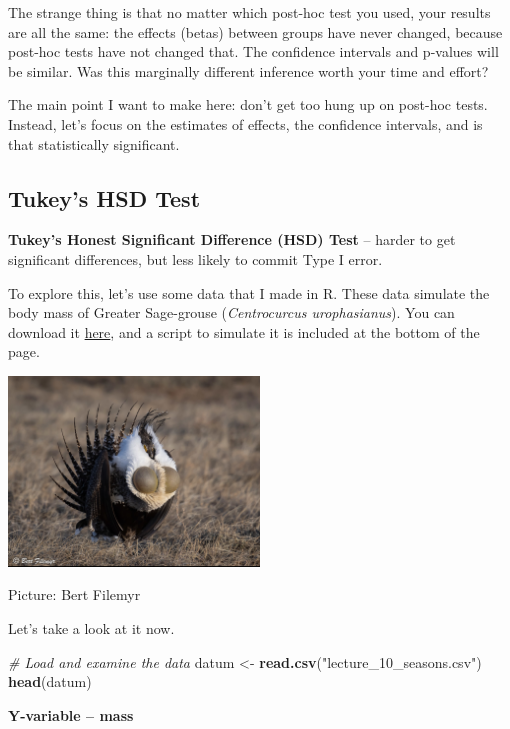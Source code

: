 \documentclass[
]{article}
\newenvironment{Shaded}{\begin{snugshade}}{\end{snugshade}}
\newcommand{\CommentTok}[1]{\textcolor[rgb]{0.56,0.35,0.01}{\textit{#1}}}
\newcommand{\FunctionTok}[1]{\textcolor[rgb]{0.13,0.29,0.53}{\textbf{#1}}}
\newcommand{\NormalTok}[1]{#1}
\newcommand{\OtherTok}[1]{\textcolor[rgb]{0.56,0.35,0.01}{#1}}
\newcommand{\StringTok}[1]{\textcolor[rgb]{0.31,0.60,0.02}{#1}}
\begin{document}
The strange thing is that no matter which post-hoc test you used, your
results are all the same: the effects (betas) between groups have never
changed, because post-hoc tests have not changed that. The confidence
intervals and p-values will be similar. Was this marginally different
inference worth your time and effort?

The main point I want to make here: don't get too hung up on post-hoc
tests. Instead, let's focus on the estimates of effects, the confidence
intervals, and is that statistically significant.

\subsection{Tukey's HSD Test}\label{tukeys-hsd-test}

\textbf{Tukey's Honest Significant Difference (HSD) Test} -- harder to
get significant differences, but less likely to commit Type I error.

To explore this, let's use some data that I made in R. These data
simulate the body mass of Greater Sage-grouse (\emph{Centrocurcus
urophasianus}). You can download it \href{lecture_10_seasons.csv}{here},
and a script to simulate it is included at the bottom of the page.

\includegraphics[width=0.5\textwidth,height=\textheight]{pic_grouse.png}

Picture: Bert Filemyr

Let's take a look at it now.

\begin{Shaded}
\begin{Highlighting}[]
\CommentTok{\# Load and examine the data}
\NormalTok{datum }\OtherTok{\textless{}{-}} \FunctionTok{read.csv}\NormalTok{(}\StringTok{"lecture\_10\_seasons.csv"}\NormalTok{)}
\FunctionTok{head}\NormalTok{(datum)}
\end{Highlighting}
\end{Shaded}

\textbf{Y-variable -- mass}
\end{document}
